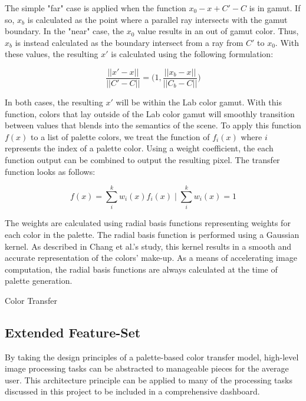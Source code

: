 \documentclass[sigchi]{acmart}
\begin{document}
The simple "far" case is applied when the function \(x_0-x+C'-C\) is in gamut. If so, \(x_b\) is calculated as the point where a parallel ray intersects with the gamut boundary. In the "near" case, the \(x_0\) value results in an out of gamut color. Thus, \(x_b\) is instead calculated as the boundary intersect from a ray from \(C'\) to \(x_0\). With these values, the resulting \(x'\) is calculated using the following formulation:

\[\frac{||x'-x||}{||C'-C||}={\Big(1,\frac{||x_b-x||}{||C_b-C||}\Big)}\]

In both cases, the resulting \(x'\) will be within the Lab color gamut. With this function, colors that lay outside of the Lab color gamut will smoothly transition between values that blends into the semantics of the scene. To apply this function \(f(x)\) to a list of palette colors, we treat the function of \(f_i(x)\) where \(i\) represents the index of a palette color. Using a weight coefficient, the each function output can be combined to output the resulting pixel. The transfer function looks as follows:

\[f(x)=\sum_{i}^{k}w_i(x)f_i(x) \mid \sum_{i}^{k}w_i(x)=1\]

The weights are calculated using radial basis functions representing weights for each color in the palette. The radial basis function is performed using a Gaussian kernel. As described in Chang et al.'s study, this kernel results in a smooth and accurate representation of the colors' make-up. As a means of accelerating image computation, the radial basis functions are always calculated at the time of palette generation.


\begin{algorithm}
	\caption{Color Transfer}
	
\end{algorithm}

\subsection{Extended Feature-Set}

By taking the design principles of a palette-based color transfer model, high-level image processing tasks can be abstracted to manageable pieces for the average user. This architecture principle can be applied to many of the processing tasks discussed in this project to be included in a comprehensive dashboard.
\end{document}
